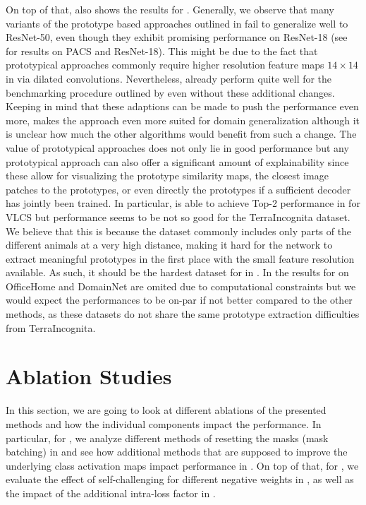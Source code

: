 On top of that,  also shows the results for \dtransformers. Generally, we observe that many variants of the prototype based approaches outlined in  fail to generalize well to ResNet-50, even though they exhibit promising performance on ResNet-18 (see  for \prodrop results on PACS and ResNet-18). This might be due to the fact that prototypical approaches commonly require higher resolution feature maps \eg $14\times14$ in \citep{DoerschGZ20} via dilated convolutions. Nevertheless, \dtransformers already perform quite well for the benchmarking procedure outlined by \domainbed even without these additional changes. Keeping in mind that these adaptions can be made to push the performance even more, makes the approach even more suited for domain generalization although it is unclear how much the other algorithms would benefit from such a change. The value of prototypical approaches does not only lie in good performance but any prototypical approach can also offer a significant amount of explainability since these allow for visualizing the prototype similarity maps, the closest image patches to the prototypes, or even directly the prototypes if a sufficient decoder has jointly been trained. In particular, \dtransformers is able to achieve Top-2 performance in \domainbed for VLCS but performance seems to be not so good for the TerraIncognita dataset. We believe that this is because the dataset commonly includes only parts of the different animals at a very high distance, making it hard for the network to extract meaningful prototypes in the first place with the small feature resolution available. As such, it should be the hardest dataset for \dtransformers in \domainbed. In  the results for \dtransformers on OfficeHome and DomainNet are omited due to computational constraints but we would expect the performances to be on-par if not better compared to the other methods, as these datasets do not share the same prototype extraction difficulties from TerraIncognita.


\section{Ablation Studies}
\label{sec:ablation}

In this section, we are going to look at different ablations of the presented methods and how the individual components impact the performance. In particular, for \divcams, we analyze different methods of resetting the masks (mask batching) in  and see how additional methods that are supposed to improve the underlying class activation maps impact performance in . On top of that, for \prodrop, we evaluate the effect of self-challenging for different negative weights in , as well as the impact of the additional intra-loss factor in .

